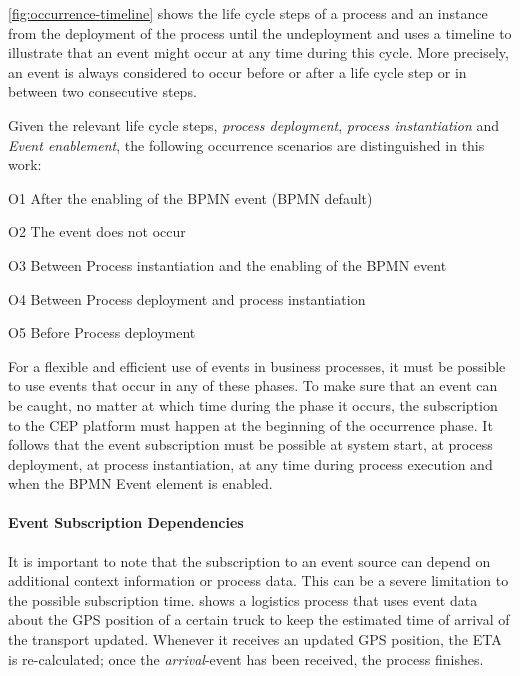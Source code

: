 \autoref{fig:occurrence-timeline} shows the life cycle steps of a process and an instance from the deployment of the process until the undeployment and uses a timeline to illustrate that an event might occur at any time during this cycle. More precisely, an event is always considered to occur before or after a life cycle step or in between two consecutive steps.

Given the relevant life cycle steps, \textit{process deployment}, \textit{process instantiation} and \textit{Event enablement}, the following occurrence scenarios are distinguished in this work:
\begin{aenumerate}
	\item O1 After the enabling of the BPMN event (BPMN default)
	\item O2 The event does not occur
	\item O3 Between Process instantiation and the enabling of the BPMN event
	\item O4 Between Process deployment and process instantiation
	\item O5 Before Process deployment
\end{aenumerate}\label{def:occurrence-times}


For a flexible and efficient use of events in business processes, it must be possible to use events that occur in any of these phases.
To make sure that an event can be caught, no matter at which time during the phase it occurs, the subscription to the CEP platform must happen at the beginning of the occurrence phase.
It follows that the event subscription must be possible at system start, at process deployment, at process instantiation, at any time during process execution and when the BPMN Event element is enabled.

\paragraph{Event Subscription Dependencies}
It is important to note that the subscription to an event source can depend on additional context information or process data. This can be a severe limitation to the possible subscription time.
 shows a logistics process that uses event data about the GPS position of a certain truck to keep the estimated time of arrival of the transport updated. Whenever it receives an updated GPS position, the ETA is re-calculated; once the \textit{arrival}-event has been received, the process finishes.

